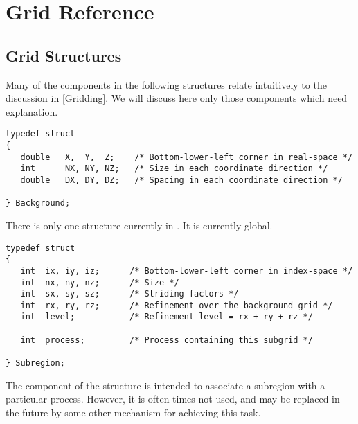 
\newpage
\section{Grid Reference}
\label{Grid Reference}


\subsection{Grid Structures}
\label{Grid Structures}

Many of the components in the following structures relate intuitively
to the discussion in \ref{Gridding}.
We will discuss here only those components which need explanation.

\begin{display}\begin{verbatim}
typedef struct
{
   double   X,  Y,  Z;    /* Bottom-lower-left corner in real-space */
   int      NX, NY, NZ;   /* Size in each coordinate direction */
   double   DX, DY, DZ;   /* Spacing in each coordinate direction */

} Background;
\end{verbatim}\end{display}

There is only one  structure currently in \parflow{}.
It is currently global.

\begin{display}\begin{verbatim}
typedef struct
{
   int  ix, iy, iz;      /* Bottom-lower-left corner in index-space */
   int  nx, ny, nz;      /* Size */
   int  sx, sy, sz;      /* Striding factors */
   int  rx, ry, rz;      /* Refinement over the background grid */
   int  level;           /* Refinement level = rx + ry + rz */

   int  process;         /* Process containing this subgrid */

} Subregion;
\end{verbatim}\end{display}

The  component of the  structure is
intended to associate a subregion with a particular process.
However, it is often times not used, and may be replaced in the
future by some other mechanism for achieving this task.

